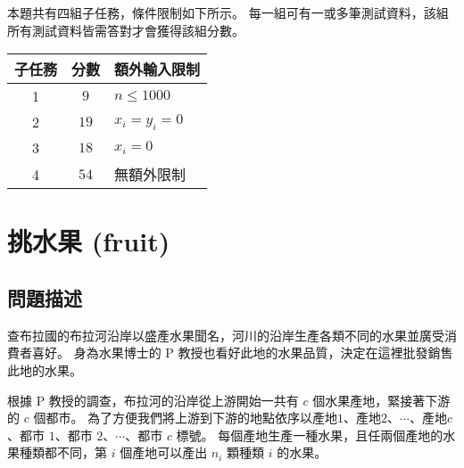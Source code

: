 本題共有四組子任務，條件限制如下所示。
每一組可有一或多筆測試資料，該組所有測試資料皆需答對才會獲得該組分數。

\begin{longtable}[]{@{}ccl@{}}
\toprule
子任務 & 分數 & 額外輸入限制 \\
\midrule
\endhead
1 & \(9\) & \begin{math}n \le 1000\end{math} \\
2 & \(19\) & \begin{math}x_i = y_i = 0\end{math} \\
3 & \(18\) & \begin{math}x_i = 0\end{math} \\
4 & \(54\) & 無額外限制 \\
\bottomrule
\end{longtable}

\section{挑水果 (fruit)}

\subsection{問題描述}

查布拉國的布拉河沿岸以盛產水果聞名，河川的沿岸生產各類不同的水果並廣受消費者喜好。
身為水果博士的 P
教授也看好此地的水果品質，決定在這裡批發銷售此地的水果。

根據 P 教授的調查，布拉河的沿岸從上游開始一共有 \begin{math}c\end{math}
個水果產地，緊接著下游的 \begin{math}c\end{math} 個都市。
為了方便我們將上游到下游的地點依序以產地\begin{math}1\end{math}、產地\begin{math}2\end{math}、\begin{math}\cdots\end{math}、產地\begin{math}c\end{math}、都市
\begin{math}1\end{math}、都市
\begin{math}2\end{math}、\begin{math}\cdots\end{math}、都市
\begin{math}c\end{math} 標號。
每個產地生產一種水果，且任兩個產地的水果種類都不同，第
\begin{math}i\end{math} 個產地可以產出 \begin{math}n_i\end{math} 顆種類
\begin{math}i\end{math} 的水果。

